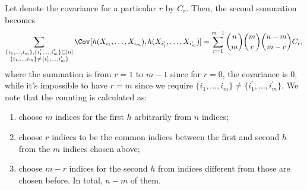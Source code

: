 Let denote the covariance for a particular \(r\) by \(C_r\). Then, the second summation becomes
\[
	\sum_{\substack{\{ i_1, \dots , i_m \} , \{ i_1^{\prime} , \dots , i_m^{\prime} \} \subseteq [n] \\ \{ i_1 , \dots , i_m \} \neq \{ i_1^{\prime} , \dots , i_m^{\prime} \}}} \Cov_{}[h(X_{i_1}, \dots , X_{i_m}) , h(X_{i_1^{\prime} }, \dots , X_{i_m^{\prime} })]
	= \sum_{r=1}^{m-1} \binom{n}{m} \binom{m}{r} \binom{n-m}{m-r} C_r,
\]
where the summation is from \(r = 1\) to \(m-1\) since for \(r = 0\), the covariance is \(0\), while it's impossible to have \(r = m\) since we require \(\{ i_1 , \dots , i_m \} \neq \{ i_1^{\prime} , \dots , i_m^{\prime} \}\). We note that the counting is calculated as:
\begin{enumerate}
	\item choose \(m\) indices for the first \(h\) arbitrarily from \(n\) indices;
	\item choose \(r\) indices to be the common indices between the first and second \(h\) from the \(m\) indices chosen above;
	\item choose \(m-r\) indices for the second \(h\) from indices different from those are chosen before. In total, \(n-m\) of them.
\end{enumerate}